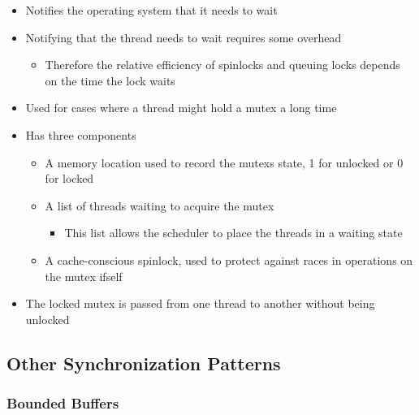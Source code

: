 \documentclass[11pt]{article}
\providecommand{\tightlist}{%
      \setlength{\itemsep}{0pt}\setlength{\parskip}{0pt}}
\begin{document}
\begin{itemize}
  \begin{itemize}
  \tightlist
  \item
    Notifies the operating system that it needs to wait
  \item
    Notifying that the thread needs to wait requires some overhead

    \begin{itemize}
    \tightlist
    \item
      Therefore the relative efficiency of spinlocks and queuing locks
      depends on the time the lock waits
    \end{itemize}
  \item
    Used for cases where a thread might hold a mutex a long time
  \item
    Has three components

    \begin{itemize}
    \tightlist
    \item
      A memory location used to record the mutexs state, 1 for unlocked
      or 0 for locked
    \item
      A list of threads waiting to acquire the mutex

      \begin{itemize}
      \tightlist
      \item
        This list allows the scheduler to place the threads in a waiting
        state
      \end{itemize}
    \item
      A cache-conscious spinlock, used to protect against races in
      operations on the mutex ifself
    \end{itemize}
  \item
    The locked mutex is passed from one thread to another without being
    unlocked
  \end{itemize}
\end{itemize}

    \subsection{Other Synchronization
Patterns}\label{other-synchronization-patterns}

    \subsubsection{Bounded Buffers}\label{bounded-buffers}
\end{document}

